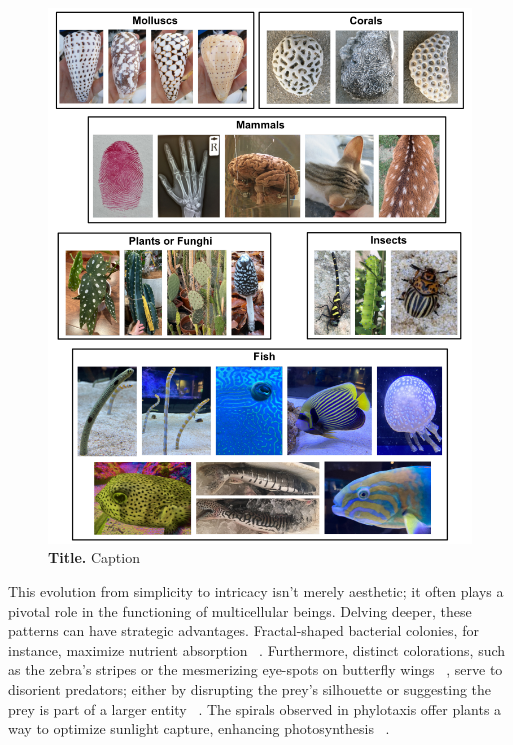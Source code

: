 \begin{figure}[h!]
    \centering
    \includegraphics[width=1\textwidth]{chapters/Introduction/pattern_examples}
    \caption{\textbf{Title.} Caption}
    \label{fig:pattern_examples}
\end{figure}
This evolution from simplicity to intricacy isn't merely aesthetic; it often plays a pivotal role in the functioning of multicellular beings.
Delving deeper, these patterns can have strategic advantages.
Fractal-shaped bacterial colonies, for instance, maximize nutrient absorption ~\parencite{Matsushita1990}.
Furthermore, distinct colorations, such as the zebra's stripes or the mesmerizing eye-spots on butterfly wings ~\parencite{Blest}, serve to disorient predators; either by disrupting the prey's silhouette or suggesting the prey is part of a larger entity ~\parencite{Stevens2006}.
The spirals observed in phylotaxis offer plants a way to optimize sunlight capture, enhancing photosynthesis ~\parencite{Strauss2020}.

